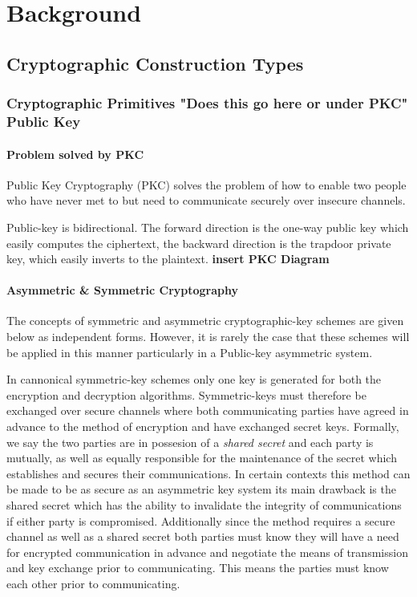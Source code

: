 \chapter{Background}

\section{Cryptographic Construction Types}

\subsection{Cryptographic Primitives "Does this go here or under PKC" Public Key}

\subsubsection{Problem solved by PKC}

Public Key Cryptography (PKC) solves the problem of how to enable two people who have never met to but need to communicate securely over insecure channels. 
 

Public-key is bidirectional. The forward direction is the one-way public key which easily computes the ciphertext, the backward direction is the trapdoor private key,
which easily inverts to the plaintext. 
\textbf{insert PKC Diagram}

\subsubsection{Asymmetric & Symmetric Cryptography} 

The concepts of symmetric and asymmetric cryptographic-key schemes are given below as independent forms. However, it is rarely the case that these schemes will be applied in this manner particularly in a Public-key asymmetric system.


In cannonical symmetric-key schemes only one key is generated for both the encryption and decryption algorithms. Symmetric-keys must therefore be exchanged over secure channels where both communicating parties have agreed in advance to the method of
encryption and have exchanged secret keys. 
\newline
Formally, we say the two parties are in possesion of a \textit{shared secret} and each party is mutually, as well as equally responsible for the maintenance of the secret which establishes and secures their communications. 
In certain contexts this method can be made to be as secure as an asymmetric key system its main drawback is the shared secret which has the ability to invalidate the integrity of communications if either party is compromised.
\newline
Additionally since the method requires a secure channel as well as a shared secret both parties must know they will have a need for encrypted communication in advance and negotiate the means of transmission and key exchange prior to communicating. This means the parties must know each other prior to communicating. 

